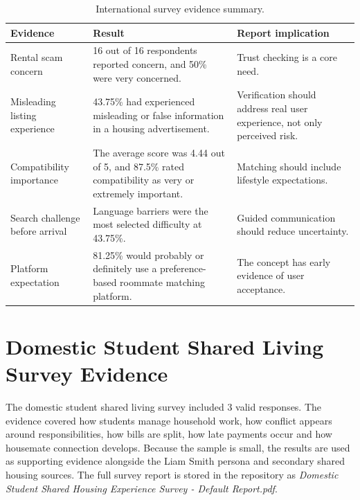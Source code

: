 \documentclass[11pt,a4paper]{article}
\begin{document}
\begin{table}[H]
    \centering
    \small
    \caption{International survey evidence summary.}
    \begin{tabularx}{\textwidth}{@{}L{4.0cm} Y Y@{}}
        \toprule
        Evidence & Result & Report implication\\
        \midrule
        Rental scam concern & 16 out of 16 respondents reported concern, and 50\% were very concerned. & Trust checking is a core need.\\
        Misleading listing experience & 43.75\% had experienced misleading or false information in a housing advertisement. & Verification should address real user experience, not only perceived risk.\\
        Compatibility importance & The average score was 4.44 out of 5, and 87.5\% rated compatibility as very or extremely important. & Matching should include lifestyle expectations.\\
        Search challenge before arrival & Language barriers were the most selected difficulty at 43.75\%. & Guided communication should reduce uncertainty.\\
        Platform expectation & 81.25\% would probably or definitely use a preference-based roommate matching platform. & The concept has early evidence of user acceptance.\\
        \bottomrule
    \end{tabularx}
\end{table}

\section{Domestic Student Shared Living Survey Evidence}

The domestic student shared living survey included 3 valid responses. The evidence covered how students manage household work, how conflict appears around responsibilities, how bills are split, how late payments occur and how housemate connection develops. Because the sample is small, the results are used as supporting evidence alongside the Liam Smith persona and secondary shared housing sources. The full survey report is stored in the repository as \textit{Domestic Student Shared Housing Experience Survey - Default Report.pdf}.
\end{document}
